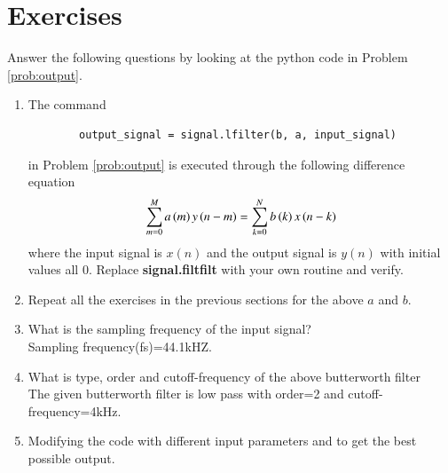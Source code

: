 \documentclass[journal,12pt,twocolumn]{IEEEtran}
\renewcommand\thesection{\arabic{section}}
\begin{document}
\section{Exercises}
Answer the following questions by looking at the python code in Problem \ref{prob:output}.
\begin{enumerate}[label=\thesection.\arabic*]
	\item
	The command
	\begin{lstlisting}
		output_signal = signal.lfilter(b, a, input_signal)
	\end{lstlisting}
	in Problem \ref{prob:output} is executed through the following difference equation
	\begin{equation}
		\label{eq:iir_filter_gen}
		\sum _{m=0}^{M}a\left(m\right)y\left(n-m\right)=\sum _{k=0}^{N}b\left(k\right)x\left(n-k\right)
	\end{equation}
	where the input signal is $x(n)$ and the output signal is $y(n)$ with initial values all 0. Replace
	\textbf{signal.filtfilt} with your own routine and verify.
	\item Repeat all the exercises in the previous sections for the above $a$ and $b$.
	\item What is the sampling frequency of the input signal?
	\\
	\solution
	Sampling frequency(fs)=44.1kHZ.
	\item
	What is type, order and  cutoff-frequency of the above butterworth filter
	\\
	\solution
	The given butterworth filter is low pass with order=2 and cutoff-frequency=4kHz.
	\item
	Modifying the code with different input parameters and to get the best possible output.
\end{enumerate}
\end{document}
